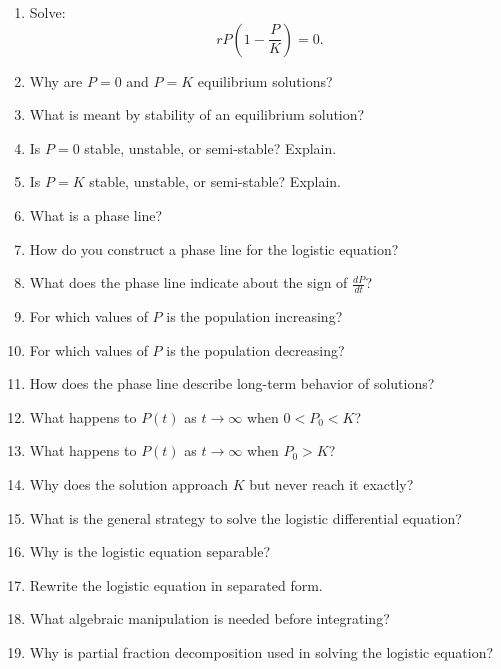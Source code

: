 \begin{enumerate}
\item Solve:
  \[
    rP\left(1 - \frac{P}{K}\right) = 0.
  \]

\item Why are $P=0$ and $P=K$ equilibrium solutions?

\item What is meant by stability of an equilibrium solution?

\item Is $P=0$ stable, unstable, or semi-stable? Explain.

\item Is $P=K$ stable, unstable, or semi-stable? Explain.

\item What is a phase line?

\item How do you construct a phase line for the logistic equation?

\item What does the phase line indicate about the sign of $\frac{dP}{dt}$?

\item For which values of $P$ is the population increasing?

\item For which values of $P$ is the population decreasing?

\item How does the phase line describe long-term behavior of solutions?

\item What happens to $P(t)$ as $t \to \infty$ when $0 < P_0 < K$?

\item What happens to $P(t)$ as $t \to \infty$ when $P_0 > K$?

\item Why does the solution approach $K$ but never reach it exactly?

\item What is the general strategy to solve the logistic differential equation?

\item Why is the logistic equation separable?

\item Rewrite the logistic equation in separated form.

\item What algebraic manipulation is needed before integrating?

\item Why is partial fraction decomposition used in solving the logistic equation?


\end{enumerate}
